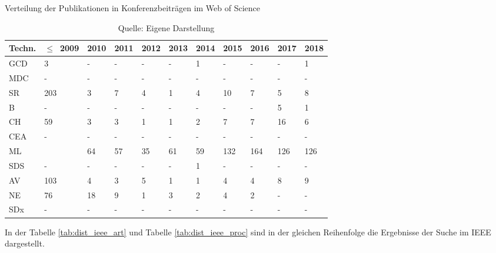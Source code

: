 \begin{table}
	\caption{Verteilung der Publikationen in Konferenzbeiträgen im \glqq Web of Science\grqq}
	\selectfont
	\footnotesize
	\centering
	\label{tab:dist_wos_proc}
\begin{tabularx}{\linewidth}{XXXXXXXXXXX}
	\hline
	Techn. & $\leq$~2009 & 2010 & 2011 & 2012 & 2013 & 2014 & 2015 & 2016 & 2017 & 2018 \\
	\hline
	\acs{GCD} & 3 & - & - & - & - & 1 & - & - & - & 1 \\
	\acs{MDC} & - & - & - & - & - & - & - & - & - & - \\
	\acs{SR} & 203 & 3 & 7 & 4 & 1 & 4 & 10 & 7 & 5 & 8 \\
	\acs{B} & - & - & - & - & - & - & - & - & 5 & 1 \\
	\acs{CH} & 59 & 3 & 3 & 1 & 1 & 2 & 7 & 7 & 16 & 6 \\
	\acs{CEA} & - & - & - & - & - & - & - & - & - & - \\
	\acs{ML} & \numprint{2042} & 64 & 57 & 35 & 61 & 59 & 132 & 164 & 126 & 126 \\
	\acs{SDS} & - & - & - & - & - & 1 & - & - & - & - \\
	\acs{AV} & 103 & 4 & 3 & 5 & 1 & 1 & 4 & 4 & 8 & 9 \\
	\acs{NE} & 76 & 18 & 9 & 1 & 3 & 2 & 4 & 2 & - & - \\
	\acs{SDx} & - & - & - & - & - & - & - & - & - & - \\
	\hline
\end{tabularx}
\caption*{Quelle: Eigene Darstellung}
\end{table}

In der Tabelle \ref{tab:dist_ieee_art} und Tabelle \ref{tab:dist_ieee_proc} sind in der gleichen Reihenfolge die Ergebnisse der Suche im \ac{IEEE} dargestellt.

